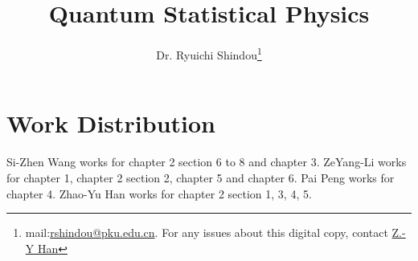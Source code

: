 \documentclass[twoside]{book}
\numberwithin{equation}{section}
\begin{document}
\title{Quantum Statistical Physics}
\author{Dr. Ryuichi Shindou\footnote{mail:\href{mailto:rshindou@pku.edu.cn}{rshindou@pku.edu.cn}. For any issues about this digital copy, contact \href{heinsius@pku.edu.cn}{Z.-Y Han}}}
\maketitle


\tableofcontents











\newpage

\chapter*{Work Distribution}
Si-Zhen Wang works for chapter 2 section 6 to 8 and chapter 3. ZeYang-Li works for chapter 1, chapter 2 section 2, chapter 5 and chapter 6. Pai Peng works for chapter 4. Zhao-Yu Han works for chapter 2 section 1, 3, 4, 5. 
\end{document}
